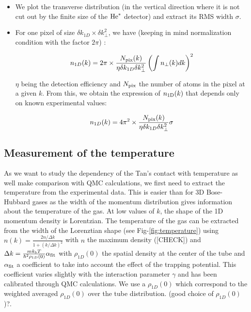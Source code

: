 \begin{itemize}
    \item We plot the transverse distribution (in the vertical direction where it is not cut out by the finite size of the $\mathrm{He}^*$ detector) and extract its RMS width $\sigma$. 
    \item For one pixel of size $\delta k_{1D} \times \delta k_{\perp}^2$, we have (keeping in mind normalization condition with the factor $2\pi$) :
    

    \begin{align}
        n_{1D}(k) &= 2\pi \times \frac{N_{\rm{pix}}(k)}{\eta \delta k_{1D} \delta k_{\perp}^2} \left(\int n_{\perp}(k) dk \right)^2 \\
    \end{align}
    
    \noindent $\eta$ being the detection efficiency and $N_{\rm{pix}}$ the number of atoms in the pixel at a given $k$. From this, we obtain the expression of $n_{\rm{1D}}(k)$ that depends only on known experimental values:
    
    \begin{equation}
        n_{1D}(k) = 4\pi^2 \times \frac{N_{\rm{pix}}(k)}{\eta \delta k_{1D} \delta k_{\perp}^2} \sigma 
    \end{equation}

    

\end{itemize}


\subsection{Measurement of the temperature}

As we want to study the dependency of the Tan's contact with temperature as well make comparison with QMC calculations, we first need to extract the temperature from the experimental data. This is easier than for 3D Bose-Hubbard gases as the width of the momentum distribution gives information about the temperature of the gas. At low values of $k$, the shape of the 1D momentum density is Lorentzian.  The temperature of the gas can be extracted from the width of the Lorenztian shape (see Fig-\ref{fig:temperature}) using $n(k)=\frac{2n/\Delta k }{1+(k/\Delta k)^2}$ with $n$ the maximum density ({\color{blue}[CHECK]}) and $\Delta k=\frac{m k_b T}{\hbar^2 \rho_{1D}(0)} \alpha_{\rm{fit}}$ with $\rho_{1D}(0)$ the spatial density at the center of the tube and $\alpha_{\rm{fit}}$ a coefficient to take into account the effect of the trapping potential. This coefficient varies slightly with the interaction parameter $\gamma$ and has been calibrated through QMC calculations. We use a $\rho_{1D}(0)$ which correspond to the weighted averaged $\rho_{1D}(0)$ over the tube distribution. {\color{blue}(good choice of $\rho_{1D}(0)$)?}. 

